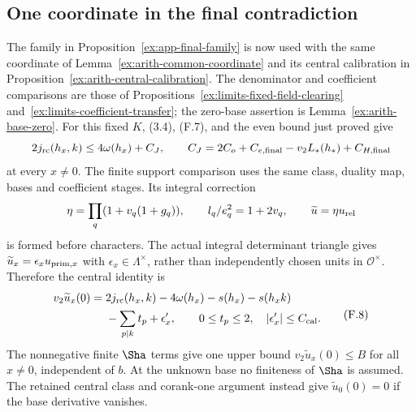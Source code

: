 \subsection{One coordinate in the final contradiction}
The family in Proposition~\ref{ex:app-final-family} is now used with
the same coordinate of Lemma~\ref{ex:arith-common-coordinate}
and its central calibration in
Proposition~\ref{ex:arith-central-calibration}. The denominator and
coefficient comparisons are those of
Propositions~\ref{ex:limits-fixed-field-clearing}
and~\ref{ex:limits-coefficient-transfer}; the zero-base assertion is
Lemma~\ref{ex:arith-base-zero}.
For this fixed $K$, (3.4), (F.7), and the even bound just proved give
\[
 2j_{\rm rc}(h_x,k)\le4\omega(h_x)+C_J,\qquad
 C_J=2C_o+C_{e,\rm final}-v_2L_*(h_*)+C_{H,\rm final}
\]
at every $x\ne0$.
The finite support comparison uses the same class, duality map,
bases and coefficient stages. Its integral correction
\[
 \eta=\prod_q(1+v_q(1+g_q)),\qquad l_q/e_q^2=1+2v_q,
 \qquad \widetilde u=\eta u_{\rm rel}
\]
is formed before characters. The actual integral determinant
triangle gives $\widetilde u_x=\epsilon_xu_{{\rm prim},x}$ with
$\epsilon_x\in\Lambda^\times$, rather than independently chosen
units in $\mathscr O^\times$. Therefore the central identity is
\[
 \begin{split}
 v_2\widetilde u_x(0)={}&2j_{\rm rc}(h_x,k)-4\omega(h_x)
       -s(h_x)-s(h_xk)\\
       &-\sum_{p\mid k}t_p+\epsilon'_x,\qquad
 0\le t_p\le2,\quad |\epsilon'_x|\le C_{\rm cal}.
 \end{split}                                                    \tag{F.8}
\]
The nonnegative finite $\Sha$ terms give one upper bound
$v_2\widetilde u_x(0)\le B$ for all $x\ne0$, independent of $b$.
At the unknown base no finiteness of $\Sha$ is assumed.
The retained central class and corank-one argument instead give
$\widetilde u_0(0)=0$ if the base derivative vanishes.


